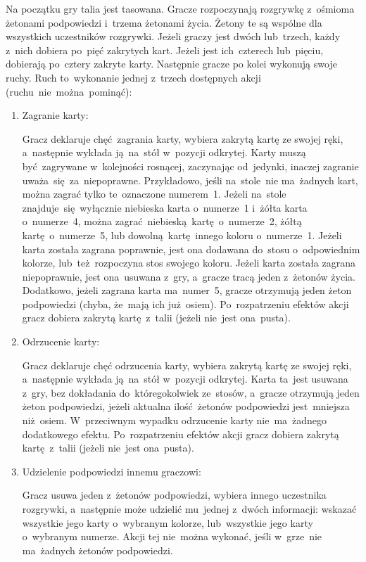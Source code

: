 \documentclass[declaration,shortabstract,inz]{iithesis}
\begin{document}
Na początku gry talia jest tasowana. Gracze rozpoczynają rozgrywkę z~ośmioma żetonami podpowiedzi i~trzema żetonami życia. Żetony te są wspólne dla wszystkich uczestników rozgrywki. Jeżeli graczy jest dwóch lub~trzech, każdy z~nich dobiera po~pięć zakrytych kart. Jeżeli jest ich~czterech lub~pięciu, dobierają po~cztery zakryte karty. Następnie gracze po kolei wykonują swoje ruchy. Ruch to~wykonanie jednej z~trzech dostępnych akcji (ruchu~nie~można~pominąć):
\begin{enumerate}
	\item Zagranie karty:

	Gracz deklaruje chęć zagrania karty, wybiera zakrytą kartę ze swojej ręki, a~następnie wykłada ją~na~stół w~pozycji odkrytej. Karty muszą być~zagrywane w~kolejności rosnącej, zaczynając od~jedynki, inaczej zagranie uważa~się za~niepoprawne. Przykładowo, jeśli na~stole~nie ma~żadnych kart, można zagrać tylko te~oznaczone numerem~1. Jeżeli na~stole znajduje~się wyłącznie niebieska karta o~numerze~1 i~żółta karta o~numerze~4, można zagrać niebieską kartę o~numerze~2, żółtą kartę o~numerze~5, lub dowolną kartę innego koloru o~numerze~1. Jeżeli karta została zagrana poprawnie, jest ona dodawana do~stosu o~odpowiednim kolorze, lub~też~rozpoczyna stos swojego koloru. Jeżeli karta została zagrana niepoprawnie, jest ona~usuwana z~gry, a~gracze tracą jeden z~żetonów życia. Dodatkowo, jeżeli zagrana karta ma~numer~5, gracze otrzymują jeden żeton podpowiedzi (chyba, że~mają ich już osiem). Po~rozpatrzeniu efektów akcji gracz dobiera zakrytą kartę z~talii (jeżeli nie~jest ona~pusta).
	
	\item Odrzucenie karty:
 
	Gracz deklaruje chęć odrzucenia karty, wybiera zakrytą kartę ze swojej ręki, a~następnie wykłada ją~na~stół w~pozycji odkrytej. Karta ta~jest usuwana z~gry, bez dokładania do~któregokolwiek ze~stosów, a~gracze otrzymują jeden żeton podpowiedzi, jeżeli aktualna ilość żetonów podpowiedzi jest~mniejsza niż~osiem. W~przeciwnym wypadku odrzucenie karty nie~ma~żadnego dodatkowego efektu. Po~rozpatrzeniu efektów akcji gracz dobiera zakrytą kartę z~talii (jeżeli nie~jest ona~pusta).

	\item Udzielenie podpowiedzi innemu graczowi:

	Gracz usuwa jeden z~żetonów podpowiedzi, wybiera innego uczestnika rozgrywki, a~następnie może udzielić mu~jednej z~dwóch informacji: wskazać wszystkie jego karty o~wybranym kolorze, lub~wszystkie jego karty o~wybranym numerze. Akcji tej nie~można wykonać, jeśli w~grze~nie ma~żadnych żetonów podpowiedzi.
\end{enumerate}
\end{document}
